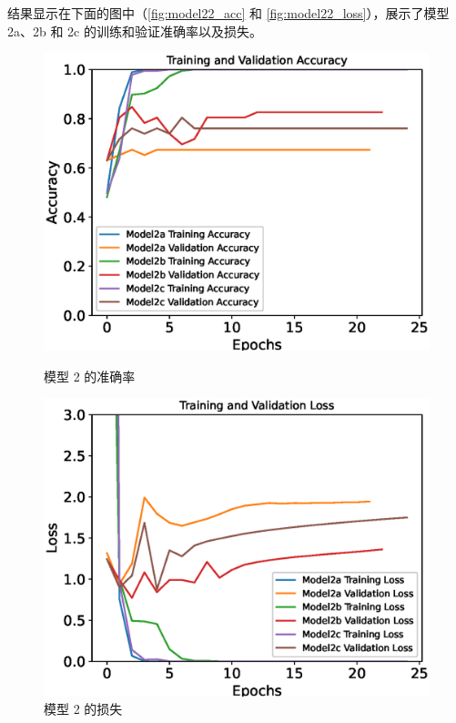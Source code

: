 结果显示在下面的图中（\autoref{fig:model22_acc} 和 \autoref{fig:model22_loss}），展示了模型 2a、2b 和 2c 的训练和验证准确率以及损失。
\begin{figure}[H]
    \centering
    \begin{minipage}{0.49\textwidth}
        \centering
        \includegraphics[width=\textwidth]{./fig/model2/accuracy22.eps}
        \caption{模型 2 的准确率}
        \label{fig:model22_acc}
    \end{minipage}
    \begin{minipage}{0.49\textwidth}
        \centering
        \includegraphics[width=\textwidth]{./fig/model2/loss22.eps}
        \caption{模型 2 的损失}
        \label{fig:model22_loss}
    \end{minipage}
\end{figure}


